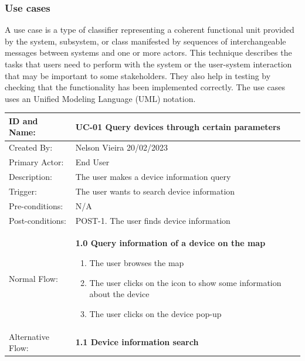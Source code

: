 \subsubsection*{Use cases}

A use case is a type of classifier representing a
coherent functional unit provided by the system, subsystem, or class manifested
by sequences of interchangeable messages between systems and one or more
actors.
\newline
This technique describes the tasks that users need to perform with
the system or the user-system interaction that may be important to some
stakeholders. They also help in testing by checking that the functionality
has been implemented correctly. The use cases uses an Unified Modeling
Language (UML) notation.

\begin{table}[H]
    \centering
    \begin{adjustbox}{width=1.2\textwidth,center=\textwidth}
        \begin{tabular}{|m{4cm}|m{12cm}|}
            \hline
            ID and Name: & UC-01 Query devices through certain parameters \\
            \hline
            Created By: & Nelson Vieira 20/02/2023 \\
            \hline
            Primary Actor: & End User \\
            \hline
            Description: & The user makes a device information query \\
            \hline
            Trigger: & The user wants to search device information \\
            \hline
            Pre-conditions: & N/A \\
            \hline
            Post-conditions: & POST-1. The user finds device information \\
            \hline
            Normal Flow: & \textbf{1.0 Query information of a device on the map}
            \begin{enumerate}
                \item The user browses the map
                \item The user clicks on the icon to show some information about the device
                \item The user clicks on the device pop-up
            \end{enumerate} \\
            \hline
            Alternative Flow: & \textbf{1.1 Device information search}

\end{tabular}
\end{adjustbox}
\end{table}
